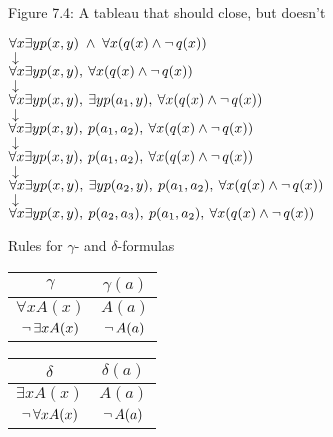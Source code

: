 \documentclass[style=simple,size=12pt]{powerdot}
\begin{document}
\begin{wideslide}[bm=,toc=]{Figure 7.4: A tableau that should close, but doesn't}
\begin{center}
$\forall x\exists yp(x,y) \;\wedge\; \forall x(q(x) \wedge \mathop{\neg} q(x))$\\
$\downarrow$\\
$\forall x\exists yp(x,y) ,\: \forall x(q(x) \wedge \mathop{\neg} q(x))$\\
$\downarrow$ \\
$\forall x\exists yp(x,y),\: \exists yp(a_{1},y),\: \forall x(q(x) \wedge \mathop{\neg} q(x))$ \\
$\downarrow$ \\
$\forall x\exists yp(x,y),\: p(a_{1},a_{2}),\: \forall x(q(x) \wedge \mathop{\neg} q(x))$\\
$\downarrow$ \\
$\forall x\exists yp(x,y),\: p(a_{1},a_{2}),\: \forall x(q(x) \wedge \mathop{\neg} q(x))$ \\
$\downarrow$ \\
$\forall x\exists yp(x,y),\: \exists yp(a_{2},y),\:
p(a_{1},a_{2}),\: \forall x(q(x) \wedge \mathop{\neg} q(x))$ \\
$\downarrow$ \\
$\forall x\exists yp(x,y) ,\: p(a_{2},a_{3}),\:
  p(a_{1},a_{2}),\: \forall x(q(x) \wedge \mathop{\neg} q(x))$
\end{center}
\end{wideslide}

\begin{wideslide}[bm=,toc=]{Rules for $\gamma$- and $\delta$-formulas}
\vspace*{1cm}
\begin{center}
\begin{minipage}[t]{0.3\textwidth}
\minisp
\begin{tabular}{|c|c|}
\hline
$\gamma$ & $\gamma(a)$  \\ \hline \hline
$\forall xA(x)$ & $A(a)$ \\ \hline
$\mathop{\neg} \exists xA(x)$ & $\mathop{\neg} A(a)$ \\ \hline
\end{tabular}
\end{minipage}
\hspace{0.07\textwidth}
\begin{minipage}[t]{0.3\textwidth}
\minisp
\begin{tabular}{|c|c|}
\hline
$\delta$ & $\delta(a)$  \\ \hline \hline
$\exists xA(x)$ & $A(a)$ \\ \hline
$\mathop{\neg} \forall xA(x)$ & $\mathop{\neg} A(a)$ \\ \hline
\end{tabular}
\end{minipage}
\end{center}
\end{wideslide}
\end{document}
